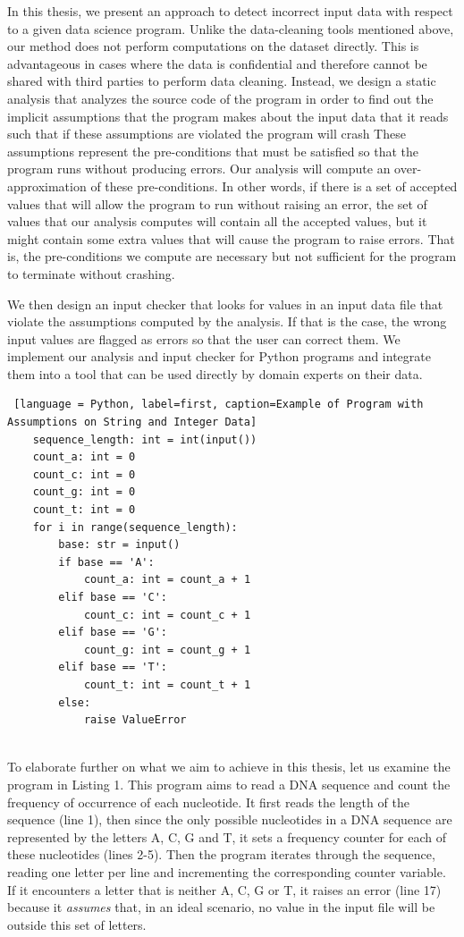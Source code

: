 \documentclass[10pt]{report}
\begin{document}
In this thesis, we present an approach to detect incorrect input data with respect to a given data science program. Unlike the data-cleaning tools mentioned above, our method does not perform computations on the dataset directly. This is advantageous in cases where the data is confidential and therefore cannot be shared with third parties to perform data cleaning. Instead, we design a static analysis that analyzes the source code of the program in order to find out the implicit assumptions that the program makes about the input data that it reads such that if these assumptions are violated the program will crash These assumptions represent the pre-conditions that must be satisfied so that the program runs without producing errors. Our analysis will compute an over-approximation of these pre-conditions. In other words, if there is a set of accepted values that will allow the program to run without raising an error, the set of values that our analysis computes will contain all the accepted values, but it might contain some extra values that will cause the program to raise errors. That is, the pre-conditions we compute are necessary but not sufficient for the program to terminate without crashing. 

We then design an input checker that looks for values in an input data file that violate the assumptions computed by the analysis. If that is the case, the wrong input values are flagged as errors so that the user can correct them. We implement our analysis and input checker for Python programs and integrate them into a tool that can be used directly by domain experts on their data. 
\begin{lstlisting} [language = Python, label=first, caption=Example of Program with Assumptions on String and Integer Data] 
	sequence_length: int = int(input())
	count_a: int = 0
	count_c: int = 0
	count_g: int = 0
	count_t: int = 0
	for i in range(sequence_length):
		base: str = input()
		if base == 'A':
			count_a: int = count_a + 1
		elif base == 'C':
			count_c: int = count_c + 1
		elif base == 'G':
			count_g: int = count_g + 1
		elif base == 'T':
			count_t: int = count_t + 1
		else:
			raise ValueError
			
\end{lstlisting} 

To elaborate further on what we aim to achieve in this thesis, let us examine the program in Listing 1. This program aims to read a DNA sequence and count the frequency of occurrence of each nucleotide. It first reads the length of the sequence (line 1), then since the only possible nucleotides in a DNA sequence are represented by the letters A, C, G and T, it sets a frequency counter for each of these nucleotides (lines 2-5). Then the program iterates through the sequence, reading one letter per line and incrementing the corresponding counter variable. If it encounters a letter that is neither A, C, G or T, it raises an error (line 17) because it \textit{assumes} that, in an ideal scenario, no value in the input file will be outside this set of letters.  
\end{document}
